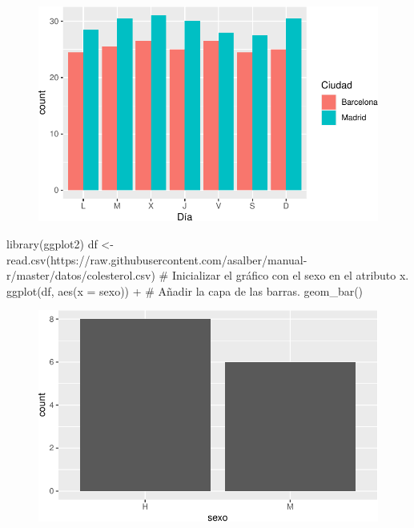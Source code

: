\documentclass[
  a4paper,
]{scrreport}
\newenvironment{Shaded}{\begin{snugshade}}{\end{snugshade}}
\newcommand{\AttributeTok}[1]{\textcolor[rgb]{0.40,0.45,0.13}{#1}}
\newcommand{\CommentTok}[1]{\textcolor[rgb]{0.37,0.37,0.37}{#1}}
\newcommand{\FunctionTok}[1]{\textcolor[rgb]{0.28,0.35,0.67}{#1}}
\newcommand{\NormalTok}[1]{\textcolor[rgb]{0.00,0.23,0.31}{#1}}
\newcommand{\OtherTok}[1]{\textcolor[rgb]{0.00,0.23,0.31}{#1}}
\newcommand{\SpecialCharTok}[1]{\textcolor[rgb]{0.37,0.37,0.37}{#1}}
\newcommand{\StringTok}[1]{\textcolor[rgb]{0.13,0.47,0.30}{#1}}
\theoremstyle{definition}
\theoremstyle{definition}
\theoremstyle{remark}
\begin{document}
\begin{figure}[H]

{\centering \includegraphics{./07-graficos_files/figure-pdf/unnamed-chunk-12-1.pdf}

}

\end{figure}

\begin{Shaded}
\begin{Highlighting}[]
\FunctionTok{library}\NormalTok{(ggplot2)}
\NormalTok{df }\OtherTok{\textless{}{-}} \FunctionTok{read.csv}\NormalTok{(}\StringTok{\textquotesingle{}https://raw.githubusercontent.com/asalber/manual{-}r/master/datos/colesterol.csv\textquotesingle{}}\NormalTok{)}
\CommentTok{\# Inicializar el gráfico con el sexo en el atributo x.}
\FunctionTok{ggplot}\NormalTok{(df, }\FunctionTok{aes}\NormalTok{(}\AttributeTok{x =}\NormalTok{ sexo)) }\SpecialCharTok{+}
\CommentTok{\# Añadir la capa de las barras.}
    \FunctionTok{geom\_bar}\NormalTok{()}
\end{Highlighting}
\end{Shaded}

\begin{figure}[H]

{\centering \includegraphics{./07-graficos_files/figure-pdf/unnamed-chunk-13-1.pdf}

}

\end{figure}
\end{document}
